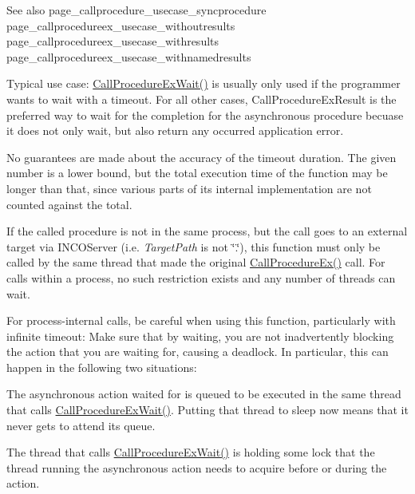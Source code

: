 \begin{DoxySeeAlso}{See also}
page\+\_\+callprocedure\+\_\+usecase\+\_\+syncprocedure~\newline
 page\+\_\+callprocedureex\+\_\+usecase\+\_\+withoutresults~\newline
 page\+\_\+callprocedureex\+\_\+usecase\+\_\+withresults~\newline
 page\+\_\+callprocedureex\+\_\+usecase\+\_\+withnamedresults
\end{DoxySeeAlso}
Typical use case\+: \hyperlink{group__commonfunctions_ga1b55ca711acd0dcc672e5fefe5cff27e}{Call\+Procedure\+Ex\+Wait()} is usually only used if the programmer wants to wait with a timeout. For all other cases, Call\+Procedure\+Ex\+Result is the preferred way to wait for the completion for the asynchronous procedure becuase it does not only wait, but also return any occurred application error.

No guarantees are made about the accuracy of the timeout duration. The given number is a lower bound, but the total execution time of the function may be longer than that, since various parts of its internal implementation are not counted against the total.

If the called procedure is not in the same process, but the call goes to an external target via I\+N\+C\+O\+Server (i.\+e. {\itshape Target\+Path} is not {\ttfamily \char`\"{}.\char`\"{}}), this function must only be called by the same thread that made the original \hyperlink{group__commonfunctions_ga6b9c6b3f22614e8a2072f8c490402131}{Call\+Procedure\+Ex()} call. For calls within a process, no such restriction exists and any number of threads can wait.

For process-\/internal calls, be careful when using this function, particularly with infinite timeout\+: Make sure that by waiting, you are not inadvertently blocking the action that you are waiting for, causing a deadlock. In particular, this can happen in the following two situations\+:
\begin{DoxyItemize}
\item The asynchronous action waited for is queued to be executed in the same thread that calls \hyperlink{group__commonfunctions_ga1b55ca711acd0dcc672e5fefe5cff27e}{Call\+Procedure\+Ex\+Wait()}. Putting that thread to sleep now means that it never gets to attend its queue.
\item The thread that calls \hyperlink{group__commonfunctions_ga1b55ca711acd0dcc672e5fefe5cff27e}{Call\+Procedure\+Ex\+Wait()} is holding some lock that the thread running the asynchronous action needs to acquire before or during the action.
\end{DoxyItemize}

